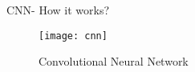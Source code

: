\begin{frame}[t]{CNN- How it works?}
    \begin{figure}[h]
        
        \texttt{[image: cnn]}
        \caption{Convolutional Neural Network \cite{CNN}}   
    \end{figure}
\end{frame}